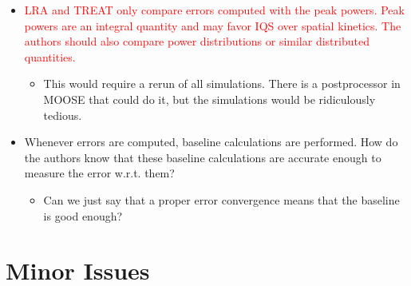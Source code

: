 \documentclass{elsarticle}
\newcommand{\fix}{\textsquare}
\newcommand{\medm}[1]{\textcolor{BurntOrange}{#1}}
\newcommand{\hard}[1]{\textcolor{Red}{#1}}
\begin{document}
\begin{itemize}
\item[\fix] \hard{ LRA and TREAT only compare errors computed with the peak powers. Peak powers are an integral quantity and may favor IQS over spatial kinetics. The authors should also compare power distributions or similar distributed quantities. }
\begin{itemize}
\item This would require a rerun of all simulations. There is a postprocessor in MOOSE that could do it, but the simulations would be ridiculously tedious.
\end{itemize}

\item[\fix] \medm{  Whenever errors are computed, baseline calculations are performed. How do the authors know that these baseline calculations are accurate enough to measure the error w.r.t. them? }
\begin{itemize}
\item Can we just say that a proper error convergence means that the baseline is good enough?
\end{itemize}

\end{itemize}

\section*{Minor Issues}
\end{document}
